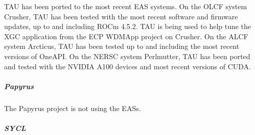 TAU has been ported to the most recent EAS systems.  On the OLCF system Crusher,
TAU has been tested with the most recent software and firmware updates, up to
and including ROCm 4.5.2.  TAU is being used to help tune the XGC application
from the ECP WDMApp project on Crusher.  On the ALCF system Arcticus, TAU has 
been tested up to and including the most recent versions of OneAPI.  On the 
NERSC system Perlmutter, TAU has been ported and tested with the NVIDIA A100 
devices and most recent versions of CUDA.


\subparagraph{Papyrus}

The Papyrus project is not using the EASs. 

\subparagraph{SYCL}


